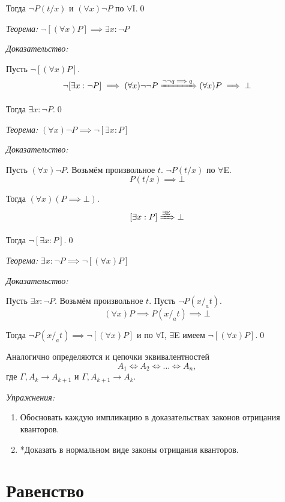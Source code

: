 Тогда $\lnot P(t/x)$ и $(\forall x)\lnot P$
по $\forall$I.\qed

\vspace{1em}
{\it Теорема:} $\lnot[(\forall x)P]\implies \exists x:\lnot P$

{\it Доказательство:}

Пусть $\lnot[(\forall x)P]$.
\[
	\lnot[\exists x:\lnot P]\implies (\forall x)\lnot\lnot P
	\xRightarrow{\lnot\lnot q\implies q} (\forall x)P\implies\bot
\]

Тогда $\exists x:\lnot P$.\qed

\vspace{1em}
{\it Теорема:} $(\forall x)\lnot P\implies \lnot[\exists x:P]$

{\it Доказательство:}

Пусть $(\forall x)\lnot P$. Возьмём произвольное $t$. $\lnot P(t/x)$ по $\forall$E.
\[
	P(t/x)\implies \bot
\]

Тогда $(\forall x)(P\implies \bot)$.
\[
	[\exists x:P]\xRightarrow{\text{$\exists$E}} \bot
\]

Тогда $\lnot[\exists x:P]$.\qed

\vspace{1em}
{\it Теорема:} $\exists x:\lnot P\implies\lnot[(\forall x)P]$

{\it Доказательство:}

Пусть $\exists x:\lnot P$. Возьмём произвольное $t$. Пусть $\lnot P(x/_{a}t)$.
\[
	(\forall x)P\implies P(x/_{a}t)\implies \bot
\]

Тогда ${\lnot P(x/_{a}t)\implies \lnot[(\forall x)P]}$ и по $\forall$I, $\exists$E
имеем $\lnot[(\forall x)P]$.\qed

\vspace{1em}
Аналогично определяются и цепочки эквивалентностей
\[
	A_1\iff A_2\iff ...\iff A_{n},
\]
где $\Gamma,A_{k}\to A_{k+1}$ и $\Gamma,A_{k+1}\to A_{k}$.

\vspace{1em}
{\it Упражнения:}
\begin{enumerate}
	\item{}Обосновать каждую импликацию в доказательствах законов отрицания кванторов.
	\item{}*Доказать в нормальном виде законы отрицания кванторов.
\end{enumerate}

\section{Равенство}

